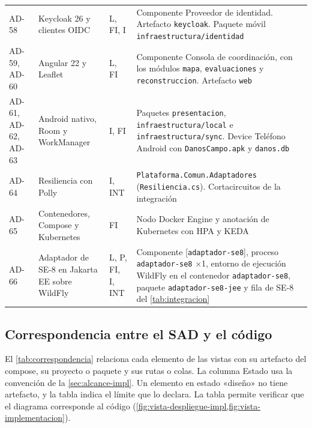 \documentclass[11pt,letterpaper]{article}
\providecommand{\br}{\discretionary{}{}{}}
\begin{document}
\begin{longtable}{L{1.3cm} L{5.2cm} L{1.6cm} L{7.4cm}}
AD-58 & Keycloak 26 y clientes OIDC & L, FI, I & Componente Proveedor de identidad. Artefacto
\texttt{keycloak}. Paquete móvil \texttt{infraestructura/\br{}identidad} \\
AD-59, AD-60 & Angular 22 y Leaflet & L, FI & Componente Consola de coordinación, con los módulos
\texttt{mapa}, \texttt{evaluaciones} y \texttt{reconstruccion}. Artefacto \texttt{web} \\
AD-61, AD-62, AD-63 & Android nativo, Room y WorkManager & I, FI & Paquetes \texttt{presentacion},
\texttt{infraestructura/\br{}local} e \texttt{infraestructura/\br{}sync}. Device Teléfono Android con
\texttt{DanosCampo.\br{}apk} y \texttt{danos.db} \\
AD-64 & Resiliencia con Polly & I, INT & \texttt{Plataforma.\br{}Comun.\br{}Adaptadores}
(\texttt{Resiliencia.\br{}cs}). Cortacircuitos de la integración \\
AD-65 & Contenedores, Compose y Kubernetes & FI & Nodo Docker Engine y anotación de Kubernetes con
HPA y KEDA \\
AD-66 & Adaptador de SE-8 en Jakarta EE sobre WildFly & L, P, FI, I, INT & Componente
[\texttt{adaptador-se8}], proceso \texttt{adaptador-se8} ×1, entorno de ejecución WildFly en el
contenedor \texttt{adaptador-se8}, paquete \texttt{adaptador-\br{}se8-\br{}jee} y fila de SE-8 del
\cref{tab:integracion} \\
\end{longtable}

\subsection{Correspondencia entre el SAD y el código}
\label{sec:correspondencia}

El \cref{tab:correspondencia} relaciona cada elemento de las vistas con su artefacto del compose,
su proyecto o paquete y sus rutas o colas. La columna Estado usa la convención de la
\cref{sec:alcance-impl}. Un elemento en estado «diseño» no tiene artefacto, y la tabla indica el
límite que lo declara. La tabla permite verificar que el diagrama corresponde al código
(\cref{fig:vista-despliegue-impl,fig:vista-implementacion}).
\end{document}
